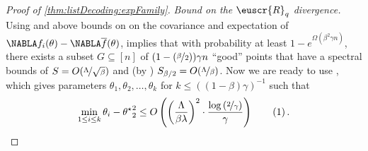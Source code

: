 \documentclass[11pt]{article}
\theoremstyle{plain}
\theoremstyle{definition}
\theoremstyle{remark}
\newcommand{\yesnum}{\addtocounter{equation}{1}\tag{\theequation}}
\newcommand{\inparen}[1]{\left(#1\right)}
\let\norm\relax
\newcommand{\norm}[1]{\ensuremath{\left\lVert #1 \right\rVert}}
\newcommand{\sfrac}[2]{{#1/#2}}
\newcommand{\nfrac}[2]{\nicefrac{#1}{#2}}
\newcommand*{\Nabla}{\boldsymbol\NABLA}
\let\nabla\Nabla
\newcommand{\customcal}[1]{\euscr{#1}}
\newcommand{\cR}{\customcal{R}}
\newcommand{\itparagraph}[1]{\medskip \noindent\textit{#1}~}
\begin{document}
\begin{proof}[Proof of \cref{thm:listDecoding:expFamily}]
                \itparagraph{Bound on the $\cR_q$ divergence.}
                    Using \cite[Proposition B.1]{charikar2017learning} and above bounds on on the covariance and expectation of $\nabla f_i(\theta) - \nabla \overline{f}(\theta)$, implies that with probability at least $1-e^{\Omega(\beta^2\gamma n)}$, there exists a subset $G\subseteq [n]$ of $(1-(\nfrac{\beta}{2}))\gamma n$  ``good'' points that have a spectral bounds of $S=O(\nfrac{\Lambda}{\sqrt{\beta}})$ and (by \cite[Proposition 5.6]{charikar2017learning}) $S_{\sfrac{\beta}{2}}=O(\nfrac{\Lambda}{\beta})$.
                    Now we are ready to use \cite[Theorem 6.1]{charikar2017learning}, which gives parameters $\theta_1,\theta_2,\dots,\theta_k$ for $k\leq \inparen{(1-\beta)\gamma}^{-1}$ such that 
                    \[
                        \min_{1\leq i\leq k}\norm{\theta_i-\theta^\star}_2^2
                        \leq 
                        O\inparen{
                            \inparen{\frac{\Lambda}{\beta\lambda}}^2
                            \cdot
                            \frac{\log\inparen{\nfrac{2}{\gamma}}}{\gamma}
                        }
                        \yesnum\label{eq:application:listDecoding:paramDistance}
                        \,.
                    \] 

                \medskip 
                

\end{proof}
\end{document}
